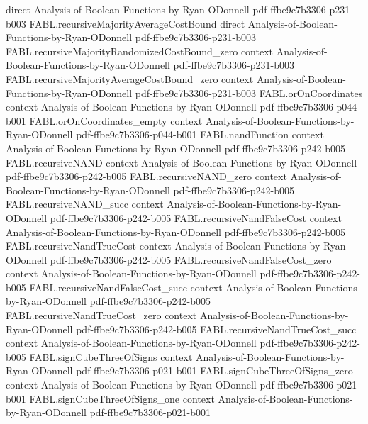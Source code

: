 \begin{theorem}
  {direct}
  {Analysis-of-Boolean-Functions-by-Ryan-ODonnell}
  {pdf-ffbe9c7b3306-p231-b003}
\proofstep
  {FABL.recursiveMajorityAverageCostBound}
  {direct}
  {Analysis-of-Boolean-Functions-by-Ryan-ODonnell}
  {pdf-ffbe9c7b3306-p231-b003}
\proofstep
  {FABL.recursiveMajorityRandomizedCostBound_zero}
  {context}
  {Analysis-of-Boolean-Functions-by-Ryan-ODonnell}
  {pdf-ffbe9c7b3306-p231-b003}
\proofstep
  {FABL.recursiveMajorityAverageCostBound_zero}
  {context}
  {Analysis-of-Boolean-Functions-by-Ryan-ODonnell}
  {pdf-ffbe9c7b3306-p231-b003}
\proofstep
  {FABL.orOnCoordinates}
  {context}
  {Analysis-of-Boolean-Functions-by-Ryan-ODonnell}
  {pdf-ffbe9c7b3306-p044-b001}
\proofstep
  {FABL.orOnCoordinates_empty}
  {context}
  {Analysis-of-Boolean-Functions-by-Ryan-ODonnell}
  {pdf-ffbe9c7b3306-p044-b001}
\proofstep
  {FABL.nandFunction}
  {context}
  {Analysis-of-Boolean-Functions-by-Ryan-ODonnell}
  {pdf-ffbe9c7b3306-p242-b005}
\proofstep
  {FABL.recursiveNAND}
  {context}
  {Analysis-of-Boolean-Functions-by-Ryan-ODonnell}
  {pdf-ffbe9c7b3306-p242-b005}
\proofstep
  {FABL.recursiveNAND_zero}
  {context}
  {Analysis-of-Boolean-Functions-by-Ryan-ODonnell}
  {pdf-ffbe9c7b3306-p242-b005}
\proofstep
  {FABL.recursiveNAND_succ}
  {context}
  {Analysis-of-Boolean-Functions-by-Ryan-ODonnell}
  {pdf-ffbe9c7b3306-p242-b005}
\proofstep
  {FABL.recursiveNandFalseCost}
  {context}
  {Analysis-of-Boolean-Functions-by-Ryan-ODonnell}
  {pdf-ffbe9c7b3306-p242-b005}
\proofstep
  {FABL.recursiveNandTrueCost}
  {context}
  {Analysis-of-Boolean-Functions-by-Ryan-ODonnell}
  {pdf-ffbe9c7b3306-p242-b005}
\proofstep
  {FABL.recursiveNandFalseCost_zero}
  {context}
  {Analysis-of-Boolean-Functions-by-Ryan-ODonnell}
  {pdf-ffbe9c7b3306-p242-b005}
\proofstep
  {FABL.recursiveNandFalseCost_succ}
  {context}
  {Analysis-of-Boolean-Functions-by-Ryan-ODonnell}
  {pdf-ffbe9c7b3306-p242-b005}
\proofstep
  {FABL.recursiveNandTrueCost_zero}
  {context}
  {Analysis-of-Boolean-Functions-by-Ryan-ODonnell}
  {pdf-ffbe9c7b3306-p242-b005}
\proofstep
  {FABL.recursiveNandTrueCost_succ}
  {context}
  {Analysis-of-Boolean-Functions-by-Ryan-ODonnell}
  {pdf-ffbe9c7b3306-p242-b005}
\proofstep
  {FABL.signCubeThreeOfSigns}
  {context}
  {Analysis-of-Boolean-Functions-by-Ryan-ODonnell}
  {pdf-ffbe9c7b3306-p021-b001}
\proofstep
  {FABL.signCubeThreeOfSigns_zero}
  {context}
  {Analysis-of-Boolean-Functions-by-Ryan-ODonnell}
  {pdf-ffbe9c7b3306-p021-b001}
\proofstep
  {FABL.signCubeThreeOfSigns_one}
  {context}
  {Analysis-of-Boolean-Functions-by-Ryan-ODonnell}
  {pdf-ffbe9c7b3306-p021-b001}
\proofstep

\end{theorem}
